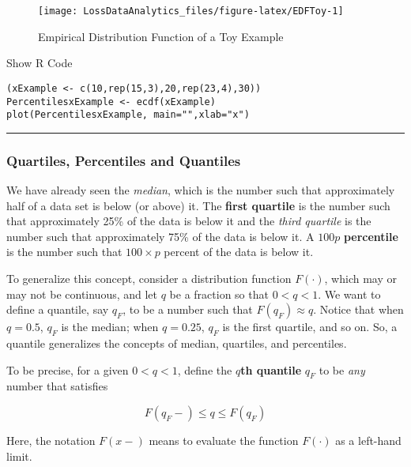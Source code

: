 \documentclass[]{book}
\theoremstyle{definition}
\theoremstyle{definition}
\theoremstyle{definition}
\theoremstyle{remark}
\begin{document}
\begin{figure}

{\centering \texttt{[image: LossDataAnalytics\_files/figure-latex/EDFToy-1]} 

}

\caption{Empirical Distribution Function of a Toy Example}\label{fig:EDFToy}
\end{figure}

Show R Code

\hypertarget{toggleToy}{}
\begin{verbatim}
(xExample <- c(10,rep(15,3),20,rep(23,4),30))
PercentilesxExample <- ecdf(xExample)
plot(PercentilesxExample, main="",xlab="x")
\end{verbatim}

\begin{center}\rule{0.5\linewidth}{\linethickness}\end{center}

\subsubsection{Quartiles, Percentiles and
Quantiles}\label{S:MS:QuantileEstimator}

We have already seen the \emph{median}, which is the number such that
approximately half of a data set is below (or above) it. The
\textbf{first quartile} is the number such that approximately 25\% of
the data is below it and the \emph{third quartile} is the number such
that approximately 75\% of the data is below it. A \(100p\)
\textbf{percentile} is the number such that \(100 \times p\) percent of
the data is below it.

To generalize this concept, consider a distribution function
\(F(\cdot)\), which may or may not be continuous, and let \(q\) be a
fraction so that \(0<q<1\). We want to define a quantile, say \(q_F\),
to be a number such that \(F(q_F) \approx q\). Notice that when
\(q = 0.5\), \(q_F\) is the median; when \(q = 0.25\), \(q_F\) is the
first quartile, and so on. So, a quantile generalizes the concepts of
median, quartiles, and percentiles.

To be precise, for a given \(0<q<1\), define the \(q\)\textbf{th
quantile} \(q_F\) to be \emph{any} number that satisfies

\begin{equation} 
  F(q_F-) \le q \le F(q_F)
  \label{eq:Quantile}
\end{equation}

Here, the notation \(F(x-)\) means to evaluate the function \(F(\cdot)\)
as a left-hand limit.
\end{document}
